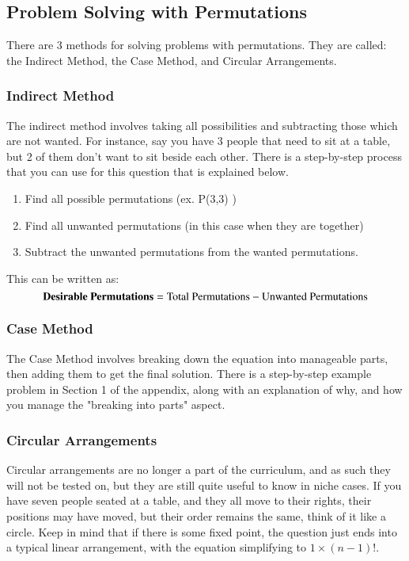\documentclass[final,1p,12pt]{elsarticle}
\begin{document}
    \subsection{Problem Solving with Permutations}
    There are 3 methods for solving problems with permutations. They are called: the Indirect Method, the Case Method, and Circular Arrangements.
    
        \subsubsection{Indirect Method}
        The indirect method involves taking all possibilities and subtracting those which are not wanted. For instance, say you have 3 people that need to sit at a table, but 2 of them don't want to sit beside each other. There is a step-by-step process that you can use for this question that is explained below.
        \begin{enumerate}
                \item Find all possible permutations (ex. P(3,3) )
                \item Find all unwanted permutations (in this case when they are together)
                \item Subtract the unwanted permutations from the wanted permutations.
            \end{enumerate}
        This can be written as: \[\mbox{\textbf{Desirable Permutations}} = \mbox{Total Permutations} - \mbox{Unwanted Permutations}\]
    
        \subsubsection{Case Method}
        The Case Method involves breaking down the equation into manageable parts, then adding them to get the final solution. There is a step-by-step example problem in Section 1 of the appendix, along with an explanation of why, and how you manage the "breaking into parts" aspect.
    
        \clearpage
    
        \subsubsection{Circular Arrangements}
        Circular arrangements are no longer a part of the curriculum, and as such they will not be tested on, but they are still quite useful to know in niche cases. If you have seven people seated at a table, and they all move to their rights, their positions may have moved, but their order remains the same, think of it like a circle. Keep in mind that if there is some fixed point, the question just ends into a typical linear arrangement, with the equation simplifying to $1 \times (n-1)!$.
\end{document}

